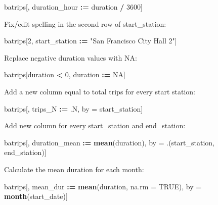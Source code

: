 \documentclass[]{book}
\newenvironment{Shaded}{\begin{snugshade}}{\end{snugshade}}
\newcommand{\DataTypeTok}[1]{\textcolor[rgb]{0.13,0.29,0.53}{#1}}
\newcommand{\DecValTok}[1]{\textcolor[rgb]{0.00,0.00,0.81}{#1}}
\newcommand{\ErrorTok}[1]{\textcolor[rgb]{0.64,0.00,0.00}{\textbf{#1}}}
\newcommand{\KeywordTok}[1]{\textcolor[rgb]{0.13,0.29,0.53}{\textbf{#1}}}
\newcommand{\NormalTok}[1]{#1}
\newcommand{\OperatorTok}[1]{\textcolor[rgb]{0.81,0.36,0.00}{\textbf{#1}}}
\newcommand{\OtherTok}[1]{\textcolor[rgb]{0.56,0.35,0.01}{#1}}
\newcommand{\StringTok}[1]{\textcolor[rgb]{0.31,0.60,0.02}{#1}}
\begin{document}
\begin{Shaded}
\begin{Highlighting}[]
\NormalTok{batrips[, duration_hour }\OperatorTok{:}\ErrorTok{=}\StringTok{ }\NormalTok{duration }\OperatorTok{/}\StringTok{ }\DecValTok{3600}\NormalTok{]}
\end{Highlighting}
\end{Shaded}

Fix/edit spelling in the second row of start\_station:

\begin{Shaded}
\begin{Highlighting}[]
\NormalTok{batrips[}\DecValTok{2}\NormalTok{, start_station }\OperatorTok{:}\ErrorTok{=}\StringTok{ "San Francisco City Hall 2"}\NormalTok{]}
\end{Highlighting}
\end{Shaded}

Replace negative duration values with NA:

\begin{Shaded}
\begin{Highlighting}[]
\NormalTok{batrips[duration }\OperatorTok{<}\StringTok{ }\DecValTok{0}\NormalTok{, duration }\OperatorTok{:}\ErrorTok{=}\StringTok{ }\OtherTok{NA}\NormalTok{]}
\end{Highlighting}
\end{Shaded}

Add a new column equal to total trips for every start station:

\begin{Shaded}
\begin{Highlighting}[]
\NormalTok{batrips[, trips_N }\OperatorTok{:}\ErrorTok{=}\StringTok{ }\NormalTok{.N, by =}\StringTok{ }\NormalTok{start_station]}
\end{Highlighting}
\end{Shaded}

Add new column for every start\_station and end\_station:

\begin{Shaded}
\begin{Highlighting}[]
\NormalTok{batrips[, duration_mean }\OperatorTok{:}\ErrorTok{=}\StringTok{ }\KeywordTok{mean}\NormalTok{(duration), by =}\StringTok{ }\NormalTok{.(start_station, end_station)]}
\end{Highlighting}
\end{Shaded}

Calculate the mean duration for each month:

\begin{Shaded}
\begin{Highlighting}[]
\NormalTok{batrips[, mean_dur }\OperatorTok{:}\ErrorTok{=}\StringTok{ }\KeywordTok{mean}\NormalTok{(duration, }\DataTypeTok{na.rm =} \OtherTok{TRUE}\NormalTok{), }
\NormalTok{            by =}\StringTok{ }\KeywordTok{month}\NormalTok{(start_date)]}
\end{Highlighting}
\end{Shaded}
\end{document}
